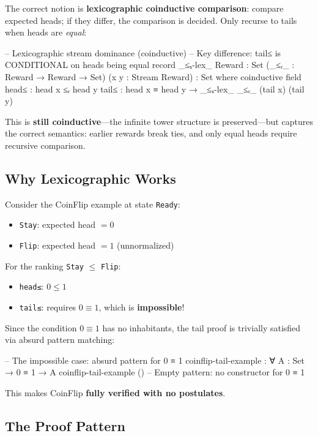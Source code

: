 \documentclass[9pt,a4paper]{article}
\theoremstyle{plain}
\theoremstyle{definition}
\theoremstyle{remark}
\begin{document}
The correct notion is \textbf{lexicographic coinductive comparison}: compare expected heads; if they differ, the comparison is decided. Only recurse to tails when heads are \emph{equal}:

\begin{code}
  -- Lexicographic stream dominance (coinductive)
  -- Key difference: tail≤ is CONDITIONAL on heads being equal
  record _≤ₛ-lex_ {Reward : Set} (_≤ᵣ_ : Reward → Reward → Set) 
                  (x y : Stream Reward) : Set where
    coinductive
    field
      head≤ : head x ≤ᵣ head y
      tail≤ : head x ≡ head y → _≤ₛ-lex_ _≤ᵣ_ (tail x) (tail y)
\end{code}

\noindent This is \textbf{still coinductive}---the infinite tower structure is preserved---but captures the correct semantics: earlier rewards break ties, and only equal heads require recursive comparison.

\subsection{Why Lexicographic Works}

Consider the CoinFlip example at state \texttt{Ready}:
\begin{itemize}
\item \texttt{Stay}: expected head $= 0$
\item \texttt{Flip}: expected head $= 1$ (unnormalized)
\end{itemize}

For the ranking \texttt{Stay} $\le$ \texttt{Flip}:
\begin{itemize}
\item \texttt{head≤}: $0 \le 1$ \checkmark
\item \texttt{tail≤}: requires $0 \equiv 1$, which is \textbf{impossible}!
\end{itemize}

Since the condition $0 \equiv 1$ has no inhabitants, the tail proof is trivially satisfied via absurd pattern matching:

\begin{code}
  -- The impossible case: absurd pattern for 0 ≡ 1
  coinflip-tail-example : ∀ {A : Set} → 0 ≡ 1 → A
  coinflip-tail-example ()  -- Empty pattern: no constructor for 0 ≡ 1
\end{code}

\noindent This makes CoinFlip \textbf{fully verified with no postulates}.

\subsection{The Proof Pattern}
\end{document}
